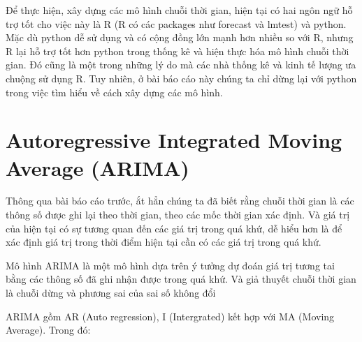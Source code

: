
Để thực hiện, xây dựng các mô hình chuỗi thời gian, hiện tại có hai ngôn ngữ hỗ trợ tốt cho việc này là R (R có các packages như forecast và lmtest) và python. Mặc dù python dễ sử dụng và có cộng đồng lớn mạnh hơn nhiều so với R, nhưng R lại hỗ trợ tốt hơn python trong thống kê và hiện thực hóa mô hình chuỗi thời gian. Đó cũng là một trong những lý do mà các nhà thống kê và kinh tế lượng ưa chuộng sử dụng R. Tuy nhiên, ở bài báo cáo này chúng ta chỉ dừng lại với python trong việc tìm hiểu về cách xây dựng các mô hình.

\section{Autoregressive Integrated Moving Average (ARIMA)}

Thông qua bài báo cáo trước, ắt hẳn chúng ta đã biết rằng chuỗi thời gian là các thông số được ghi lại theo thời gian, theo các mốc thời gian xác định. Và giá trị của hiện tại có sự tương quan đến các giá trị trong quá khứ, dễ hiểu hơn là để xác định giá trị trong thời điểm hiện tại cần có các giá trị trong quá khứ.

\bigskip
Mô hình ARIMA là một mô hình dựa trên ý tưởng dự đoán giá trị tương tai bằng các thông số đã ghi nhận được trong quá khứ. Và giả thuyết chuỗi thời gian là chuỗi dừng và phương sai của sai số không đổi

\bigskip
ARIMA gồm AR (Auto regression), I (Intergrated) kết hợp với MA (Moving Average). Trong đó:


